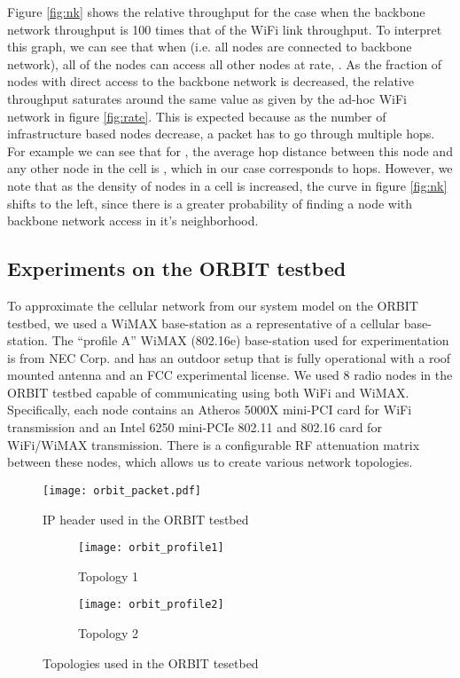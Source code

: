 \documentclass{sig-alternate-10pt}
\begin{document}
Figure \ref{fig:nk} shows the relative throughput for the case when the backbone network throughput is 100 times that of the WiFi link throughput. To interpret this graph, we can see that when  (i.e. all nodes are connected to backbone network), all of the nodes can access all other nodes at rate, . As the fraction of nodes with direct access to the backbone network is decreased, the relative throughput saturates  around the same value as given by the ad-hoc WiFi network in figure \ref{fig:rate}. This is expected because as the number of infrastructure based nodes decrease, a packet has to go through multiple hops. For example we can see that for , the average hop distance between this node and any other node in the cell is , which in our case corresponds to  hops.  However, we note that as the density of nodes in a cell is increased, the curve in figure \ref{fig:nk} shifts to the left, since there is a greater probability of finding a node with backbone network access in it's neighborhood.

\subsection{Experiments on the ORBIT testbed}
To approximate the cellular network from our system model on the ORBIT testbed, we used a WiMAX base-station as a representative  of a cellular base-station. The “profile A” WiMAX (802.16e) base-station used for experimentation is from NEC Corp. and has an outdoor setup that is fully operational with a roof mounted antenna and an FCC experimental license. We used 8 radio nodes in the ORBIT testbed capable of communicating using both WiFi and WiMAX. Specifically, each node contains an Atheros 5000X mini-PCI card for WiFi transmission and an Intel 6250 mini-PCIe 802.11 and 802.16 card for WiFi/WiMAX transmission. There is a configurable RF attenuation matrix between these nodes, which allows us to create various network topologies.

\begin{figure}[t]
\begin{center}
\texttt{[image: orbit\_packet.pdf]}
\end{center}
\caption{IP header used in the ORBIT testbed}
\label{fig:orbit_packet}
\end{figure}

\begin{figure}
        \centering
        \begin{subfigure}[b]{0.43\textwidth}
        \centering
                \texttt{[image: orbit\_profile1]}
                \caption{Topology 1}\vspace{1cm}
                \label{fig:topo1}
        \end{subfigure}
        
        \begin{subfigure}[b]{0.45\textwidth}
        \centering
                \texttt{[image: orbit\_profile2]}
                \caption{Topology 2}
                \label{fig:topo2}
        \end{subfigure}
        \caption{Topologies used in the ORBIT tesetbed}\label{fig:topos}
\end{figure}
\end{document}
